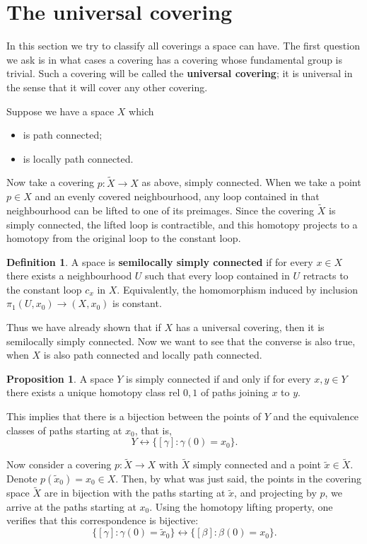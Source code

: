 \documentclass{book}
\theoremstyle{definition}
\newtheorem*{defn}{Definition}
\newtheorem*{prop}{Proposition}
\begin{document}
\section{The universal covering}

In this section we try to classify all coverings a space can
have. The first question we ask is in what cases a covering
has a covering whose fundamental group is trivial. Such a
covering will be called the \textbf{universal covering}; it
is universal in the sense that it will cover any other
covering.

Suppose we have a space $X$ which
\begin{itemize}
\item is path connected;
\item is locally path connected.
\end{itemize}
Now take a covering $p:\tilde X\to X$ as above, simply
connected. When we take a point $p\in X$ and an evenly
covered neighbourhood, any loop contained in that
neighbourhood can be lifted to one of its preimages. Since
the covering $\tilde X$ is simply connected, the lifted loop
is contractible, and this homotopy projects to a homotopy
from the original loop to the constant loop.

\begin{defn}
A space is \textbf{semilocally simply connected} if for every
$x\in X$ there exists a neighbourhood $U$ such that every
loop contained in $U$ retracts to the constant loop $c_x$ in
$X$. Equivalently, the homomorphism induced by inclusion
$\pi_1(U,x_0)\to(X,x_0)$ is constant.
\end{defn}

Thus we have already shown that if $X$ has a universal
covering, then it is semilocally simply connected. Now we
want to see that the converse is also true, when $X$ is also
path connected and locally path connected.

\begin{prop}
A space $Y$ is simply connected if and only if for every
$x,y\in Y$ there exists a unique homotopy class rel $0,1$ of
paths joining $x$ to $y$.

This implies that there is a bijection between the points of
$Y$ and the equivalence classes of paths starting at $x_0$,
that is,
$$
Y\leftrightarrow \{[\gamma]:\gamma(0)=x_0\}.
$$

Now consider a covering $p:\tilde X\to X$ with $\tilde X$
simply connected and a point $\tilde x\in\tilde X$. Denote
$p(\tilde x_0)=x_0\in X$. Then, by what was just said, the
points in the covering space $\tilde X$ are in bijection with
the paths starting at $\tilde x$, and projecting by $p$, we
arrive at the paths starting at $x_0$. Using the homotopy
lifting property, one verifies that this correspondence is
bijective:
$$
\{[\gamma]:\gamma(0)=\tilde x_0\}
\leftrightarrow
\{[\beta]:\beta(0)=x_0\}.
$$
\end{prop}
\end{document}
